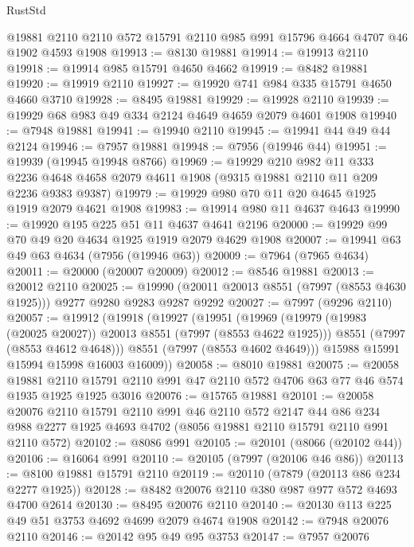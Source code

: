 \begin{lexlean}{RustStd}
\begin{coremodule}
    @19881
    @2110
    @2110
    @572
    @15791
    @2110
    @985
    @991
    @15796
    @4664
    @4707
    @46
    @1902
    @4593
    @1908
@19913 := @8130 @19881
@19914 := @19913 @2110
@19918 := @19914 @985 @15791 @4650 @4662
@19919 := @8482 @19881
@19920 := @19919 @2110
@19927 := @19920 @741 @984 @335 @15791 @4650 @4660 @3710
@19928 := @8495 @19881
@19929 := @19928 @2110
@19939 := @19929 @68 @983 @49 @334 @2124 @4649 @4659 @2079 @4601 @1908
@19940 := @7948 @19881
@19941 := @19940 @2110
@19945 := @19941 @44 @49 @44 @2124
@19946 := @7957 @19881
@19948 := @7956 (@19946 @44)
@19951 := @19939 (@19945 @19948 @8766)
@19969 := @19929
    @210
    @982
    @11
    @333
    @2236
    @4648
    @4658
    @2079
    @4611
    @1908
    (@9315 @19881 @2110 @11 @209 @2236 @9383 @9387)
@19979 := @19929 @980 @70 @11 @20 @4645 @1925 @1919 @2079 @4621 @1908
@19983 := @19914 @980 @11 @4637 @4643
@19990 := @19920 @195 @225 @51 @11 @4637 @4641 @2196
@20000 := @19929 @99 @70 @49 @20 @4634 @1925 @1919 @2079 @4629 @1908
@20007 := @19941 @63 @49 @63 @4634 (@7956 (@19946 @63))
@20009 := @7964 (@7965 @4634)
@20011 := @20000 (@20007 @20009)
@20012 := @8546 @19881
@20013 := @20012 @2110
@20025 := @19990 (@20011 @20013 @8551 (@7997 (@8553 @4630 @1925))) @9277 @9280 @9283 @9287 @9292
@20027 := @7997 (@9296 @2110)
@20057 := @19912
    (@19918
      (@19927
        (@19951
          (@19969
            (@19979 (@19983 (@20025 @20027)) @20013 @8551 (@7997 (@8553 @4622 @1925)))
            @8551
            (@7997 (@8553 @4612 @4648)))
          @8551
          (@7997 (@8553 @4602 @4649)))
        @15988
        @15991
        @15994
        @15998
        @16003
        @16009))
@20058 := @8010 @19881
@20075 := @20058
    @19881
    @2110
    @15791
    @2110
    @991
    @47
    @2110
    @572
    @4706
    @63
    @77
    @46
    @574
    @1935
    @1925
    @1925
    @3016
@20076 := @15765 @19881
@20101 := @20058
    @20076
    @2110
    @15791
    @2110
    @991
    @46
    @2110
    @572
    @2147
    @44
    @86
    @234
    @988
    @2277
    @1925
    @4693
    @4702
    (@8056 @19881 @2110 @15791 @2110 @991 @2110 @572)
@20102 := @8086 @991
@20105 := @20101 (@8066 (@20102 @44))
@20106 := @16064 @991
@20110 := @20105 (@7997 (@20106 @46 @86))
@20113 := @8100 @19881 @15791 @2110
@20119 := @20110 (@7879 (@20113 @86 @234 @2277 @1925))
@20128 := @8482 @20076 @2110 @380 @987 @977 @572 @4693 @4700 @2614
@20130 := @8495 @20076 @2110
@20140 := @20130 @113 @225 @49 @51 @3753 @4692 @4699 @2079 @4674 @1908
@20142 := @7948 @20076 @2110
@20146 := @20142 @95 @49 @95 @3753
@20147 := @7957 @20076

\end{coremodule}
\end{lexlean}
